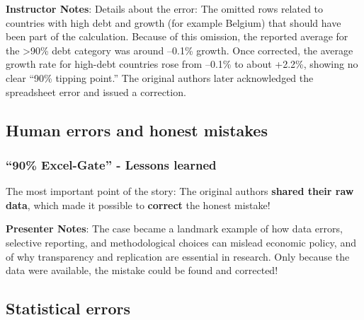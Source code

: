 \documentclass[
  letterpaper,
  DIV=11,
  numbers=noendperiod]{scrartcl}
\begin{document}
\textbf{Instructor Notes}: Details about the error: The omitted rows
related to countries with high debt and growth (for example Belgium)
that should have been part of the calculation. Because of this omission,
the reported average for the \textgreater90\% debt category was around
--0.1\% growth. Once corrected, the average growth rate for high-debt
countries rose from --0.1\% to about +2.2\%, showing no clear ``90\%
tipping point.'' The original authors later acknowledged the spreadsheet
error and issued a correction.

\subsection{Human errors and honest
mistakes}\label{human-errors-and-honest-mistakes-1}

\subsubsection{``90\% Excel-Gate'' - Lessons
learned}\label{excel-gate---lessons-learned}

\begin{tcolorbox}[enhanced jigsaw, arc=.35mm, bottomrule=.15mm, bottomtitle=1mm, breakable, colback=white, colbacktitle=quarto-callout-important-color!10!white, colframe=quarto-callout-important-color-frame, coltitle=black, left=2mm, leftrule=.75mm, opacityback=0, opacitybacktitle=0.6, rightrule=.15mm, title=\textcolor{quarto-callout-important-color}{\faExclamation}\hspace{0.5em}{Important}, titlerule=0mm, toprule=.15mm, toptitle=1mm]

The most important point of the story: The original authors
\textbf{shared their raw data}, which made it possible to
\textbf{correct} the honest mistake!

\end{tcolorbox}

\textbf{Presenter Notes}: The case became a landmark example of how data
errors, selective reporting, and methodological choices can mislead
economic policy, and of why transparency and replication are essential
in research. Only because the data were available, the mistake could be
found and corrected!

\subsection{Statistical errors}\label{statistical-errors}
\end{document}
